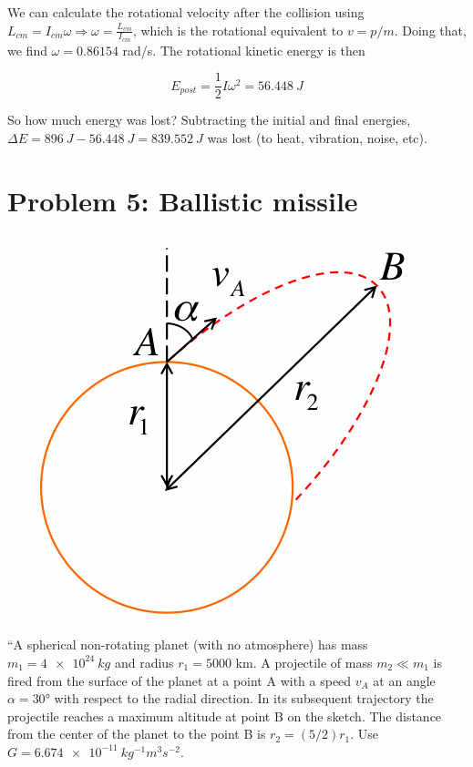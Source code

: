 \documentclass[8.01x]{subfiles}
\begin{document}
We can calculate the rotational velocity after the collision using $L_{cm} = I_{cm} \omega \Rightarrow \omega = \frac{L_{cm}}{I_{cm}}$, which is the rotational equivalent to $v = p/m$. Doing that, we find $\omega = 0.86154$ rad/s. The rotational kinetic energy is then

\begin{equation}
E_{post} = \frac{1}{2} I \omega^2 = \SI{56.448}{J}
\end{equation}

So how much energy was lost? Subtracting the initial and final energies, $\Delta E = \SI{896}{J} - \SI{56.448}{J} = \SI{839.552}{J}$ was lost (to heat, vibration, noise, etc).

\section{Problem 5: Ballistic missile}

\begin{center}
\includegraphics[scale=0.6]{Graphics/midterm3p5}
\end{center}

``A spherical non-rotating planet (with no atmosphere) has mass $m_1 = \SI{4e24}{kg}$ and radius $r_1 = 5000$ km. A projectile of mass $m_2 \ll m_1$ is fired from the surface of the planet at a point A with a speed $v_A$ at an angle $\alpha=\ang{30}$ with respect to the radial direction. In its subsequent trajectory the projectile reaches a maximum altitude at point B on the sketch. The distance from the center of the planet to the point B is $r_2 = (5/2) r_1$. Use $G = \SI{6.674e-11}{kg^{-1} m^3 s^{-2}}$.
\end{document}
